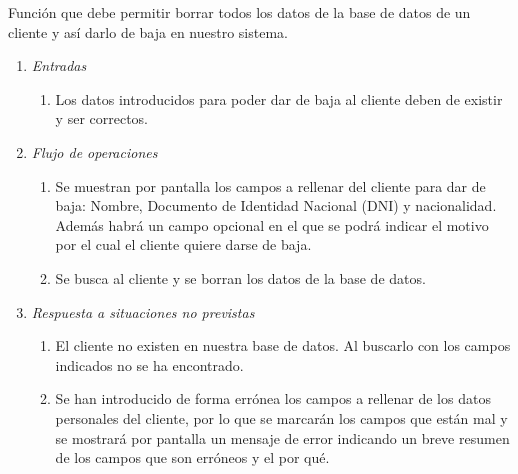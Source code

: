  \label{fun:bajacliente}
	Función que debe permitir borrar todos los datos de la base de datos de un cliente y así darlo de baja en nuestro sistema.
	
\begin{enumerate}
	\item \textit{Entradas}
	\begin{enumerate}
		\item Los datos introducidos para poder dar de baja al cliente deben de existir y ser correctos.
	\end{enumerate}
	\item \textit{Flujo de operaciones}
	\begin{enumerate}
		\item Se muestran por pantalla los campos a rellenar del cliente para dar de baja: Nombre, Documento de Identidad Nacional (DNI) y nacionalidad. Además habrá un campo opcional en el que se podrá indicar el motivo por el cual el cliente quiere darse de baja.
		\item Se busca al cliente y se borran los datos de la base de datos.
	\end{enumerate}
	\item \textit{Respuesta a situaciones no previstas}
	\begin{enumerate}
		\item El cliente no existen en nuestra base de datos. Al buscarlo con los campos indicados no se ha encontrado. 
		\item Se han introducido de forma errónea los campos a rellenar de los datos personales del cliente, por lo que se marcarán los campos que están mal y se mostrará por pantalla un mensaje de error indicando un breve resumen de los campos que son erróneos y el por qué.
	\end{enumerate}

\end{enumerate}
